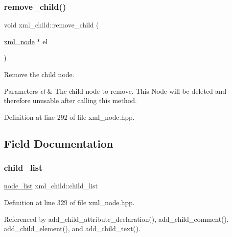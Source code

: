 \subsubsection{\texorpdfstring{remove\+\_\+child()}{remove\_child()}}
{\footnotesize\ttfamily void xml\+\_\+child\+::remove\+\_\+child (\begin{DoxyParamCaption}\item[{\hyperlink{classxml__node}{xml\+\_\+node} $\ast$}]{el }\end{DoxyParamCaption})\hspace{0.3cm}{\ttfamily [inline]}}



Remove the child node. 


\begin{DoxyParams}{Parameters}
{\em el} & The child node to remove. This Node will be deleted and therefore unusable after calling this method. \\
\hline
\end{DoxyParams}


Definition at line 292 of file xml\+\_\+node.\+hpp.



\subsection{Field Documentation}
\mbox{\label{classxml__child_a82e6e6bc4bd2ca3e594107350acf37f1}} 
\subsubsection{\texorpdfstring{child\+\_\+list}{child\_list}}
{\footnotesize\ttfamily \hyperlink{classxml__node_a4e558f6b9e873e9d0e92cfc8e7880385}{node\+\_\+list} xml\+\_\+child\+::child\+\_\+list\hspace{0.3cm}{\ttfamily [private]}}



Definition at line 329 of file xml\+\_\+node.\+hpp.



Referenced by add\+\_\+child\+\_\+attribute\+\_\+declaration(), add\+\_\+child\+\_\+comment(), add\+\_\+child\+\_\+element(), and add\+\_\+child\+\_\+text().

\mbox{\label{classxml__child_a2bb3816676f50317a11bd47c253ec792}} 
